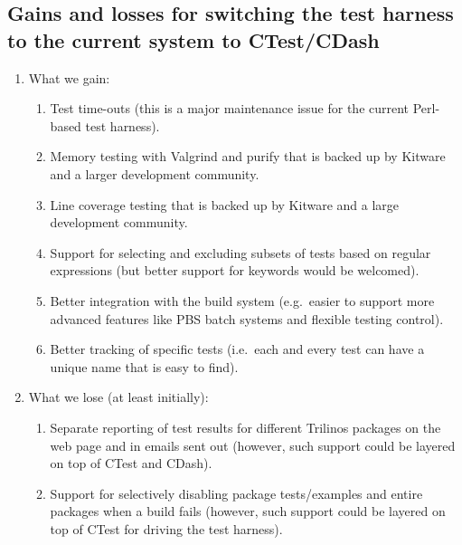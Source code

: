 \documentclass[pdf,ps2pdf,11pt]{SANDreport}
\begin{document}
%
{}\subsection{Gains and losses for switching the test harness to the
current system to CTest/CDash}
%

\begin{enumerate}

{}\item What we gain:

  \begin{enumerate}

  {}\item Test time-outs (this is a major maintenance issue for the
  current Perl-based test harness).

  {}\item Memory testing with Valgrind and purify that is backed up by
  Kitware and a larger development community.

  {}\item Line coverage testing that is backed up by Kitware and a
  large development community.

  {}\item Support for selecting and excluding subsets of tests based
  on regular expressions (but better support for keywords would be
  welcomed).

  {}\item Better integration with the build system (e.g.\ easier to
  support more advanced features like PBS batch systems and flexible
  testing control).

  {}\item Better tracking of specific tests (i.e.\ each and every test
  can have a unique name that is easy to find).

  \end{enumerate}

{}\item What we lose (at least initially):

  \begin{enumerate}

  {}\item Separate reporting of test results for different Trilinos
  packages on the web page and in emails sent out (however, such
  support could be layered on top of CTest and CDash).

  {}\item Support for selectively disabling package tests/examples and
  entire packages when a build fails (however, such support could be
  layered on top of CTest for driving the test harness).

  \end{enumerate}

\end{enumerate}
\end{document}

